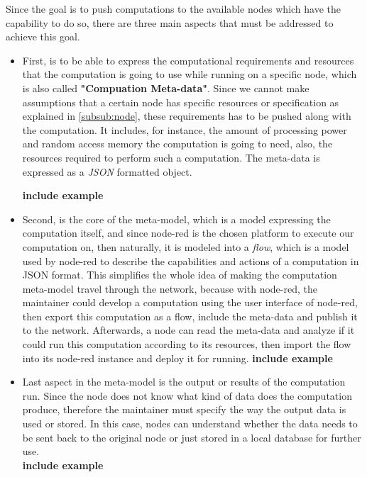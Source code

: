 Since the goal is to push computations to the available nodes which have the capability to do so, there are three main aspects that must be addressed to achieve this goal.
\begin{itemize}
	
	\item First, is to be able to express the computational requirements and resources that the computation is going to use while running on a specific node, which is also called \textbf{"Compuation Meta-data"}. Since we cannot make assumptions that a certain node has specific resources or specification as explained in \ref{subsub:node}, these requirements has to be pushed along with the computation. It includes, for instance, the amount of processing power and random access memory the computation is going to need, also, the resources required to perform such a computation.
	The meta-data is expressed as a \textit{JSON} formatted object.
	
	\textbf{include example}
	
	\item Second, is the core of the meta-model, which is a model expressing the computation itself, and since node-red is the chosen platform to execute our computation on, then naturally, it is modeled into a \textit{flow}, which is a model used by node-red to describe the capabilities and actions of a computation in JSON format. This simplifies the whole idea of making the computation meta-model travel through the network, because with node-red, the maintainer could develop a computation using the user interface of node-red, then export this computation as a flow, include the meta-data and publish it to the network. Afterwards, a node can read the meta-data and analyze if it could run this computation according to its resources, then import the flow into its node-red instance and deploy it for running.
	\textbf{include example}
	
	\item Last aspect in the meta-model is the output or results of the computation run. Since the node does not know what kind of data does the computation produce, therefore the maintainer must specify the way the output data is used or stored. In this case, nodes can understand whether the data needs to be sent back to the original node or just stored in a local database for further use. \\
	\textbf{include example}
\end{itemize}

